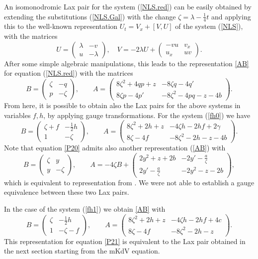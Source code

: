\documentclass{article}
\theoremstyle{plain}
\theoremstyle{definition}
\begin{document}
An isomonodromic Lax pair for the system (\ref{NLS.red}) can be easily obtained by extending the substitutions (\ref{NLS.Gal}) with the change $\zeta=\lambda-\tfrac{1}{4}t$ and applying this to the well-known representation $U_t=V_x+[V,U]$ of the system (\ref{NLS}), with the matrices
\[
 U=\begin{pmatrix}  
 \lambda & -v \\
  u & -\lambda
 \end{pmatrix},\quad
 V=-2\lambda U+\begin{pmatrix}
  -vu & v_x \\
  u_x & uv
 \end{pmatrix}.
\]
After some simple algebraic manipulations, this leads to the representation \eqref{AB} for equation (\ref{NLS.red}) with the matrices
\[
 B=\begin{pmatrix}
  \zeta & -q\\ p & -\zeta
 \end{pmatrix},\qquad 
 A=\begin{pmatrix}
  8\zeta^2+4qp+z & -8\zeta q-4q'\\[1mm]
  8\zeta p-4p' & -8\zeta^2-4pq-z-4b
 \end{pmatrix}.
\]
From here, it is possible to obtain also the Lax pairs for the above systems in variables $f,h$, by applying gauge transformations. For the system (\ref{fh0}) we have
\[
B=\begin{pmatrix}
   \zeta+f & -\tfrac{1}{2}h\\ 1 & -\zeta
 \end{pmatrix},\qquad
  A=\begin{pmatrix}
   8\zeta^2+2h+z & -4\zeta h-2hf+2\gamma\\[1mm]
   8\zeta -4f & -8\zeta^2-2h-z-4b
  \end{pmatrix}.
 \]
Note that equation \ref{P20} admits also another representation (\ref{AB}) with 
\[
 B=\begin{pmatrix} 
  \zeta & y\\
  y & -\zeta
 \end{pmatrix},
 \qquad
 A=-4\zeta B+\begin{pmatrix}  
  2y^2+z+2b & -2y'-\frac{a}{\zeta}\\[1mm] 
  2y'-\frac{a}{\zeta} & -2y^2-z-2b
 \end{pmatrix},
\] 
which is equivalent to representation from \cite{Irfan_2012}. We were not able to establish a gauge equivalence between these two Lax pairs.

In the case of the system (\ref{fh1}) we obtain \eqref{AB} with
\[
  B=\begin{pmatrix}
   \zeta & -\tfrac{1}{2}h\\ 1 & -\zeta-f
  \end{pmatrix},\qquad
  A=\begin{pmatrix}
   8\zeta^2+2h+z & -4\zeta h-2hf+4c\\[1mm]
   8\zeta -4f & -8\zeta^2-2h-z
  \end{pmatrix}.
\]
This representation for equation \ref{P21} is equivalent to the Lax pair obtained in the next section starting from the mKdV equation.
\end{document}
